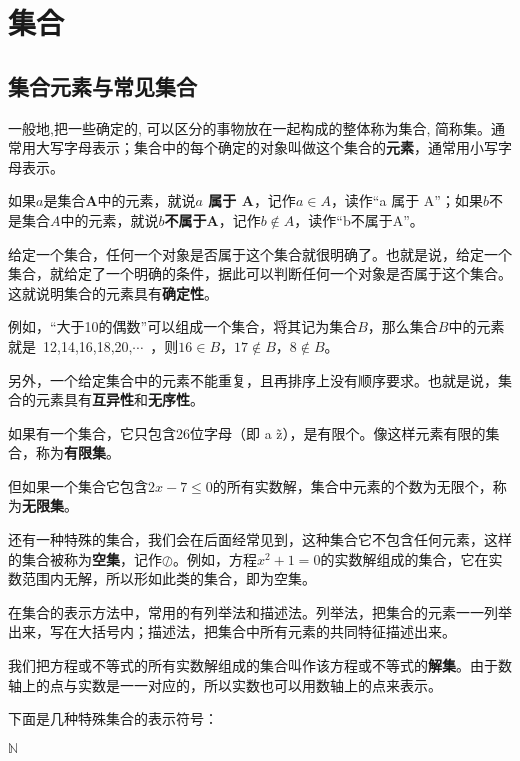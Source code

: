 \section{\textbf{集合}}

\subsection{集合元素与常见集合}

一般地,把一些确定的, 可以区分的事物放在一起构成的整体称为集合, 简称集。通常用大写字母表示；集合中的每个确定的对象叫做这个集合的\textbf{元素}，通常用小写字母表示。

如果$a$是集合\textbf{A}中的元素，就说\textbf{$a$ 属于 A}，记作$a \in A$，读作“a 属于 A”；如果$b$不是集合$A$中的元素，就说\textbf{$b$不属于A}，记作$b\notin A$，读作“b不属于A”。

\begin{tcolorbox}[colframe = blue!20, title = {\color{red} 提示}]
    给定一个集合，任何一个对象是否属于这个集合就很明确了。也就是说，给定一个集合，就给定了一个明确的条件，据此可以判断任何一个对象是否属于这个集合。这就说明集合的元素具有\textbf{确定性}。

    例如，“大于10的偶数”可以组成一个集合，将其记为集合$B$，那么集合$B$中的元素就是~12,14,16,18,20,$\cdots$~，则$16 \in B$，$17 \notin B$，$8 \notin B$。

    另外，一个给定集合中的元素不能重复，且再排序上没有顺序要求。也就是说，集合的元素具有\textbf{互异性}和\textbf{无序性}。
\end{tcolorbox}

如果有一个集合，它只包含26位字母（即 a \~ z），是有限个。像这样元素有限的集合，称为\textbf{有限集}。

但如果一个集合它包含$2x-7 \le 0$的所有实数解，集合中元素的个数为无限个，称为\textbf{无限集}。

还有一种特殊的集合，我们会在后面经常见到，这种集合它不包含任何元素，这样的集合被称为\textbf{空集}，记作$\oslash$。例如，方程$x^2 +1=0$的实数解组成的集合，它在实数范围内无解，所以形如此类的集合，即为空集。

在集合的表示方法中，常用的有列举法和描述法。列举法，把集合的元素一一列举出来，写在大括号内；描述法，把集合中所有元素的共同特征描述出来。

我们把方程或不等式的所有实数解组成的集合叫作该方程或不等式的\textbf{解集}。由于数轴上的点与实数是一一对应的，所以实数也可以用数轴上的点来表示。

下面是几种特殊集合的表示符号：

$\mathbb{N}$ 

